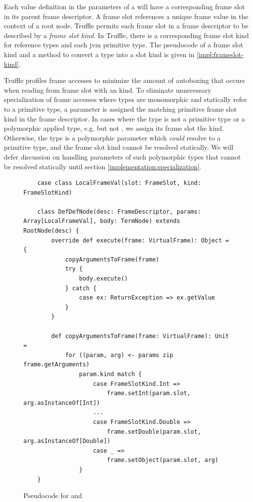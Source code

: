Each value definition in the parameters of a  will have a corresponding frame slot in its parent frame descriptor. 
A frame slot references a unique frame value in the context of a root node.
Truffle permits each frame slot in a frame descriptor to be described by a \textit{frame slot kind}.
In Truffle, there is a corresponding frame slot kind for reference types and each \acrshort{jvm} primitive type. 
The pseudocode of a frame slot kind and a method to convert a type into a slot kind is given in \ref{impl:frameslot-kind}.

Truffle profiles frame accesses to minimize the amount of autoboxing that occurs when reading from frame slot with an  kind. 
To eliminate unnecessary specialization of frame accesses where types are monomorphic and statically refer to a primitive type, a parameter is assigned the matching primitive frame slot kind in the frame descriptor. 
In cases where the type is not a primitive type or a polymorphic applied type, e.g.  but not , we assign its frame slot the  kind.
Otherwise, the type is a polymorphic parameter which \textit{could} resolve to a primitive type, and the frame slot kind cannot be resolved statically.
We will defer discussion on handling parameters of such polymorphic types that cannot be resolved statically until section \ref{implementation:specialization}.

\begin{figure}[!htb]
	\begin{verbatim}
	case class LocalFrameVal(slot: FrameSlot, kind: FrameSlotKind)
		
	class DefDefNode(desc: FrameDescriptor, params: Array[LocalFrameVal], body: TermNode) extends RootNode(desc) {
		override def execute(frame: VirtualFrame): Object = {
			copyArgumentsToFrame(frame)
			try {
				body.execute()
			} catch {
				case ex: ReturnException => ex.getValue
			}
		}	
			
		def copyArgumentsToFrame(frame: VirtualFrame): Unit = 
			for ((param, arg) <- params zip frame.getArguments) 
				param.kind match {
					case FrameSlotKind.Int =>
						frame.setInt(param.slot, arg.asInstanceOf[Int])
					...
					case FrameSlotKind.Double =>
						frame.setDouble(param.slot, arg.asInstanceOf[Double])	
					case _ =>
						frame.setObject(param.slot, arg)
				}
	}
	\end{verbatim}
	\caption{Pseudocode for  and }
	\label{impl:defdefnode}
\end{figure}

